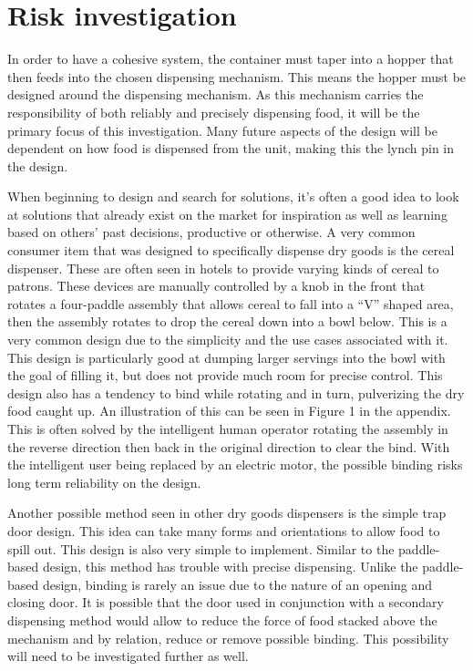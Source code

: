 \documentclass[12pt]{article}
\begin{document}
\section{Risk investigation}
    In order to have a cohesive system, the container must taper into a hopper that then feeds into the chosen dispensing mechanism. This means the hopper must be designed around the dispensing mechanism. As this mechanism carries the responsibility of both reliably and precisely dispensing food, it will be the primary focus of this investigation. Many future aspects of the design will be dependent on how food is dispensed from the unit, making this the lynch pin in the design.

When beginning to design and search for solutions, it’s often a good idea to look at solutions that already exist on the market for inspiration as well as learning based on others’ past decisions, productive or otherwise. A very common consumer item that was designed to specifically dispense dry goods is the cereal dispenser. These are often seen in hotels to provide varying kinds of cereal to patrons. These devices are manually controlled by a knob in the front that rotates a four-paddle assembly that allows cereal to fall into a “V” shaped area, then the assembly rotates to drop the cereal down into a bowl below. This is a very common design due to the simplicity and the use cases associated with it. This design is particularly good at dumping larger servings into the bowl with the goal of filling it, but does not provide much room for precise control. This design also has a tendency to bind while rotating and in turn, pulverizing the dry food caught up. An illustration of this can be seen in Figure 1  in the appendix. This is often solved by the intelligent human operator rotating the assembly in the reverse direction then back in the original direction to clear the bind. With the intelligent user being replaced by an electric motor, the possible binding risks long term reliability on the design.

Another possible method seen in other dry goods dispensers is the simple trap door design. This idea can take many forms and orientations to allow food to spill out. This design is also very simple to implement. Similar to the paddle-based design, this method has trouble with precise dispensing. Unlike the paddle-based design, binding is rarely an issue due to the nature of an opening and closing door. It is possible that the door used in conjunction with a secondary dispensing method would allow to reduce the force of food stacked above the mechanism and by relation, reduce or remove possible binding. This possibility will need to be investigated further as well.
\end{document}
